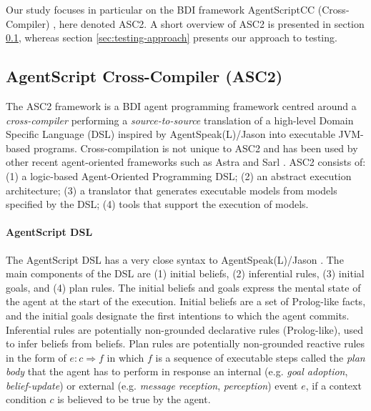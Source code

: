 Our study focuses in particular on the BDI framework AgentScriptCC (Cross-Compiler) \cite{MohajeriParizi2020}, here denoted ASC2. A short overview of ASC2 is presented in section \ref{subsec:asc2}, whereas section \ref{sec:testing-approach} presents our approach to testing.


\subsection{AgentScript Cross-Compiler (ASC2)}
\label{subsec:asc2}
The ASC2 framework is a BDI agent programming framework centred around a \textit{cross-compiler} performing a \textit{source-to-source} translation of a high-level Domain Specific Language (DSL) inspired by AgentSpeak(L)/Jason \cite{RaoAS1996,Bordini2005} into executable JVM-based programs. Cross-compilation is not unique to ASC2 and has been used by other recent agent-oriented frameworks such as Astra \cite{Astra} and Sarl \cite{Sarl}. ASC2 consists of: (1) a logic-based Agent-Oriented Programming DSL; (2) an abstract execution architecture; (3) a translator that generates executable models from models specified by the DSL; (4) tools that support the execution of models.

\paragraph{AgentScript DSL}

The AgentScript DSL has a very close syntax to AgentSpeak(L)/Jason \cite{RaoAS1996,Bordini2005}. The main components of the DSL are (1) initial beliefs, (2) inferential rules, (3) initial goals, and (4) plan rules. The initial beliefs and goals express the mental state of the agent at the start of the execution. Initial beliefs are a set of Prolog-like facts, and the initial goals designate the first intentions to which the agent commits. Inferential rules are potentially non-grounded declarative rules (Prolog-like), used to infer beliefs from beliefs. Plan rules are potentially non-grounded reactive rules in the form of $e : c \Rightarrow f$ in which $f$ is a sequence of executable steps called the \textit{plan body} that the agent has to perform in response an internal (e.g. \textit{goal adoption}, \textit{belief-update}) or external (e.g. \textit{message reception}, \textit{perception}) event $e$, if a context condition $c$ is believed to be true by the agent.

